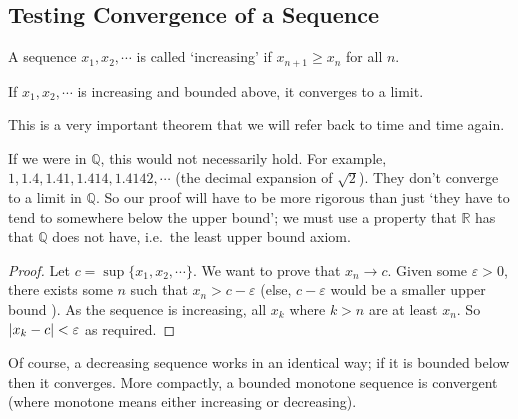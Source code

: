 \subsection{Testing Convergence of a Sequence}
A sequence \(x_1, x_2, \cdots\) is called `increasing' if \(x_{n+1} \geq x_n\) for all \(n\).
\begin{theorem}
	If \(x_1, x_2, \cdots\) is increasing and bounded above, it converges to a limit.
\end{theorem}
This is a very important theorem that we will refer back to time and time again.
\begin{note}
	If we were in \(\mathbb Q\), this would not necessarily hold. For example, \(1, 1.4, 1.41, 1.414, 1.4142, \cdots\) (the decimal expansion of \(\sqrt{2}\)). They don't converge to a limit in \(\mathbb Q\). So our proof will have to be more rigorous than just `they have to tend to somewhere below the upper bound'; we must use a property that \(\mathbb R\) has that \(\mathbb Q\) does not have, i.e.\ the least upper bound axiom.
\end{note}
\begin{proof}
	Let \(c = \sup \{ x_1, x_2, \cdots \}\). We want to prove that \(x_n \to c\). Given some \(\varepsilon > 0\), there exists some \(n\) such that \(x_n > c - \varepsilon\) (else, \(c - \varepsilon\) would be a smaller upper bound \contradiction). As the sequence is increasing, all \(x_k\) where \(k > n\) are at least \(x_n\). So \(\abs{x_k - c} < \varepsilon\) as required.
\end{proof}
Of course, a decreasing sequence works in an identical way; if it is bounded below then it converges. More compactly, a bounded monotone sequence is convergent (where monotone means either increasing or decreasing).


